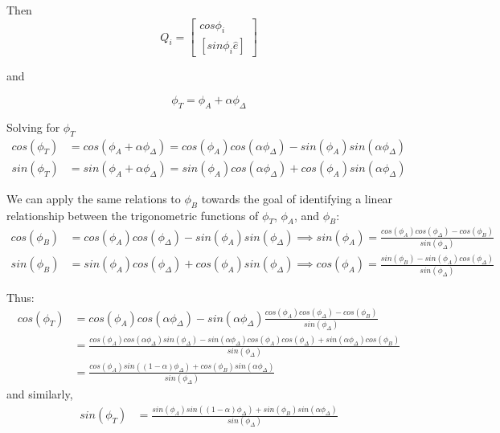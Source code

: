 \documentclass[11pt,fleqn]{report}
\begin{document}
Then
\begin{equation*}
 Q_i = \begin{bmatrix} cos \phi_i \\
                       \left[ sin \phi_i \hat e \right]
     \end{bmatrix}
\end{equation*}

and

\begin{equation*}
 \phi_T = \phi_A + \alpha \phi_\Delta
\end{equation*}

Solving for $\phi_T$
\begin{align*}
 cos( \phi_T) &= cos( \phi_A + \alpha \phi_\Delta)
               = cos( \phi_A) cos(\alpha \phi_\Delta) -
                 sin( \phi_A) sin(\alpha \phi_\Delta) \\
 sin( \phi_T) &= sin( \phi_A + \alpha \phi_\Delta)
               = sin( \phi_A) cos(\alpha \phi_\Delta) +
                 cos( \phi_A) sin(\alpha \phi_\Delta)
\end{align*}

We can apply the same relations to $\phi_B$ towards the goal of
identifying a linear relationship between the trigonometric
functions of $\phi_T$, $\phi_A$, and $\phi_B$:
\begin{align*}
 cos( \phi_B)  &= cos( \phi_A) cos(\phi_\Delta) -
                  sin( \phi_A) sin(\phi_\Delta) \implies
 sin( \phi_A)  =  \frac{ cos( \phi_A) cos(\phi_\Delta) - cos( \phi_B)}
                        { sin(\phi_\Delta)} \\
 sin( \phi_B)  &= sin( \phi_A) cos(\phi_\Delta) +
                  cos( \phi_A) sin(\phi_\Delta) \implies
 cos( \phi_A)  =  \frac{ sin( \phi_B) - sin( \phi_A) cos(\phi_\Delta) }
                        { sin(\phi_\Delta)}
\end{align*}

Thus:
\begin{align*}
 cos( \phi_T) &= cos( \phi_A) cos(\alpha \phi_\Delta) -
                 sin(\alpha \phi_\Delta)
                   \frac{ cos( \phi_A) cos(\phi_\Delta) - cos( \phi_B)}
                        { sin(\phi_\Delta)} \\
              &= \frac {cos( \phi_A) cos(\alpha \phi_\Delta) sin(\phi_\Delta) -
                        sin(\alpha \phi_\Delta)cos( \phi_A) cos(\phi_\Delta) +
                        sin(\alpha \phi_\Delta)cos( \phi_B)}
                       {sin(\phi_\Delta)} \\
              &= \frac {cos( \phi_A)  sin( (1-\alpha) \phi_\Delta) +
                        cos( \phi_B) sin( \alpha \phi_\Delta)}
                       {sin(\phi_\Delta)}
\end{align*}
and similarly,
\begin{align*}
 sin( \phi_T) &= \frac {sin( \phi_A)  sin( (1-\alpha) \phi_\Delta) +
                        sin( \phi_B) sin( \alpha \phi_\Delta)}
                       {sin(\phi_\Delta)}
\end{align*}
\end{document}
